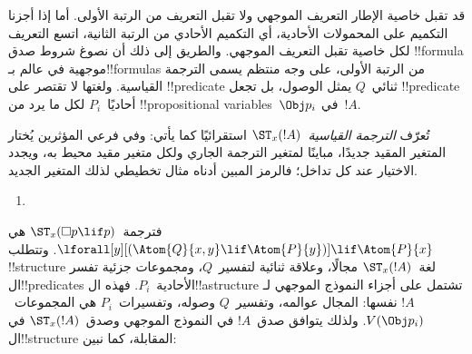 \documentclass[../../../include/open-logic-section]{subfiles}
\begin{document}


قد تقبل خاصية الإطار التعريف الموجهي ولا تقبل التعريف من الرتبة
الأولى. أما إذا أجزنا التكميم على المحمولات الأحادية، أي التكميم
الأحادي من الرتبة الثانية، اتسع التعريف لكل خاصية تقبل التعريف
الموجهي. والطريق إلى ذلك أن نصوغ شروط صدق !!{formula} موجهية
في عالم بـ!!{formula}s من الرتبة الأولى، على وجه منتظم يسمى الترجمة
القياسية. ولغتها لا تقتصر على !!{predicate} ثنائي~$Q$
يمثل الوصول، بل تجعل !!{predicate} أحاديًا~$P_i$ لكل ما يرد
من !!{propositional variable}s~$\Obj p_i$ في~$!A$.

\begin{defn}
  تُعرّف \emph{الترجمة القياسية}~$\ST_x(!A)$ استقرائيًا كما يأتي:
  وفي فرعي المؤثرين يُختار المتغير المقيد جديدًا، مباينًا لمتغير
  الترجمة الجاري ولكل متغير مقيد محيط به، ويجدد الاختيار عند كل تداخل؛
  فالرمز المبين أدناه مثال تخطيطي لذلك المتغير الجديد.
  \begin{enumerate}
  \item {}
  \end{enumerate}
\end{defn}

فترجمة~$\ST_x(\Box p \lif p)$ هي
$\lforall[y][(\Atom{Q}{x,y} \lif \Atom{P}{y})] \lif \Atom{P}{x}$.
وتتطلب !!{structure} لغة~$\ST_x(!A)$ مجالًا، وعلاقة ثنائية
لتفسير~$Q$، ومجموعات جزئية تفسر ال!!{predicate}s الأحادية~$P_i$.
فهذه ال!!a{structure} تشتمل على أجزاء النموذج الموجهي لـ$!A$
نفسها: المجال عوالمه، وتفسير~$Q$ وصوله، وتفسيرات~$P_i$
هي المجموعات~$V(\Obj p_i)$. ولذلك يتوافق صدق~$!A$ في النموذج
الموجهي وصدق~$\ST_x(!A)$ في ال!!{structure} المقابلة، كما نبين:
\end{document}
